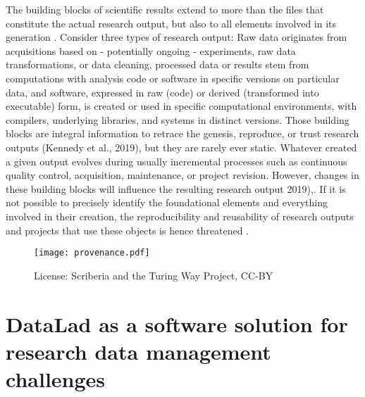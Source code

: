 



The building blocks of scientific results extend to more than the files that constitute the actual research output, but also to all elements involved in its generation \citep{claerbout1992electronic}.
Consider three types of research output: Raw data originates from acquisitions based on - potentially ongoing - experiments, raw data transformations, or data cleaning, processed data or results stem from computations with analysis code or software in specific versions on particular data, and software, expressed in raw (code) or derived (transformed into executable) form, is created or used in specific computational environments, with compilers, underlying libraries, and systems in distinct versions.
Those building blocks are integral information to retrace the genesis, reproduce, or trust research outputs (Kennedy et al., 2019), but they are rarely ever static.
Whatever created a given output evolves during usually incremental processes such as continuous quality control, acquisition, maintenance, or project revision.
However, changes in these building blocks will influence the resulting research output \citep{kennedy2019everything} 2019),\citep{glatard2015reproducibility}.
If it is not possible to precisely identify the foundational elements and everything involved in their creation, the reproducibility and reusability of research outputs and projects that use these objects is hence threatened \citep{kennedy2019everything}.

\begin{figure}
	\centering
	\texttt{[image: provenance.pdf]}
	\caption[Software provenance throughout the research process]{License: Scriberia and the Turing Way Project, CC-BY}
	\label{fig:prov1}
\end{figure}



\pagebreak

\section{DataLad as a software solution for research data management challenges}

